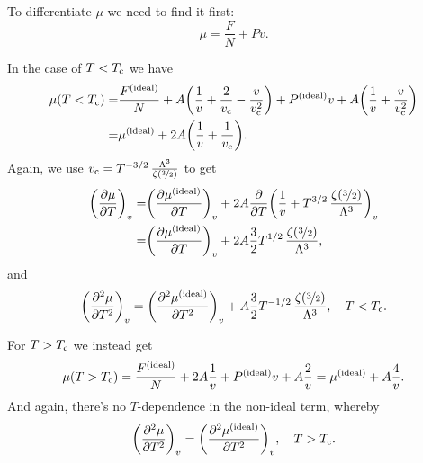 \documentclass[11pt,letter, swedish, english
]{article}
\begin{document}

\subsubsection{}
To differentiate $\mu$ we need to find it first:
\begin{equation}
\mu=\frac{F}{N}+Pv.
\end{equation}

In the case of $T<T_{\text{c}}$ we have
\begin{equation}
\begin{aligned}
\mu(T<T_{\text{c}})=&\frac{F^\text{{(ideal)}}}{N}
+A\qty(\frac{1}{v}+\frac{2}{v_{\text{c}}}-\frac{v}{v_{\text{c}}^2})
+P^\text{{(ideal)}}v+A\qty(\frac{1}{v}+\frac{v}{v_{\text{c}}^2})\\
=&\mu^\text{{(ideal)}}
+2A\qty(\frac{1}{v}+\frac{1}{v_{\text{c}}}).
\end{aligned}
\end{equation}
Again, we use
$v_{\text{c}}=T^{-3/2}\,\frac{\Lambda^3}{\zeta(\nicefrac{3}{2})}$
to get
\begin{equation}
\begin{aligned}
\qty(\pdv{\mu}{T})_v=&\qty(\pdv{\mu^\text{{(ideal)}}}{T})_v
+2A\pdv{T}\qty(\frac{1}{v}+
T^{3/2}\,\frac{\zeta(\nicefrac{3}{2})}{\Lambda^3})_v\\
=&\qty(\pdv{\mu^\text{{(ideal)}}}{T})_v
+2A\frac{3}{2}
T^{1/2}\,\frac{\zeta(\nicefrac{3}{2})}{\Lambda^3},
\end{aligned}
\end{equation}
and
\begin{equation}
\qty(\pdv[2]{\mu}{T})_v
=\qty(\pdv[2]{\ideal{\mu}}{T})_v
+A\frac{3}{2}
T^{-1/2}\,\frac{\zeta(\nicefrac{3}{2})}{\Lambda^3}
\qcomma T<\Tc.
\end{equation}

For $T>T_{\text{c}}$ we instead get
\begin{equation}
\mu(T>T_{\text{c}})=\frac{F^\text{{(ideal)}}}{N}+2A\frac{1}{v}
+P^\text{{(ideal)}}v+A\frac{2}{v}
=\mu^\text{{(ideal)}}+A\frac{4}{v}.
\end{equation}
And again, there's no $T$-dependence in the non-ideal term, whereby 
\begin{equation}
\qty(\pdv[2]{\mu}{T})_v
=\qty(\pdv[2]{\ideal{\mu}}{T})_v
\qcomma T>\Tc.
\end{equation}
\end{document}
